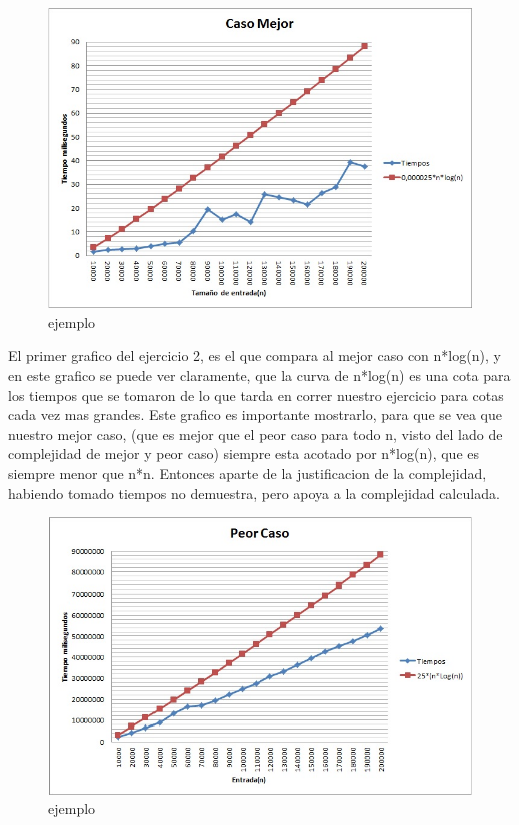 \begin{figure}[H]
  \begin{center}
      \includegraphics[scale=0.50]{imagenes/MejorCasoEj2.jpg}
  \end{center}
  \caption{ejemplo}
\end{figure}

El primer grafico del ejercicio 2, es el que compara al mejor caso con n*log(n), y en este grafico se puede ver claramente, que la curva de 
n*log(n) es una cota para los tiempos que se tomaron de lo que tarda en correr nuestro ejercicio para cotas cada vez mas grandes. Este grafico es importante mostrarlo, para que se vea que nuestro mejor caso, (que es mejor que el peor caso para todo n, visto del lado de complejidad de mejor y peor caso)
siempre esta acotado por n*log(n), que es siempre menor que n*n. Entonces aparte de la justificacion de la complejidad, habiendo tomado tiempos
no demuestra, pero apoya a la complejidad calculada.

\begin{figure}[H]
  \begin{center}
      \includegraphics[scale=0.50]{imagenes/PeorCasoEj2.jpg}
  \end{center}
  \caption{ejemplo}
\end{figure}

